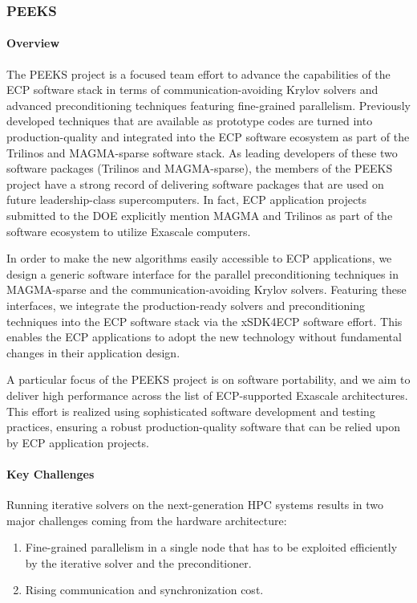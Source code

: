 \subsubsection{PEEKS} 
\paragraph{Overview} 
The PEEKS project is a focused team effort to advance the capabilities of the 
ECP software stack in terms of communication-avoiding Krylov solvers and 
advanced preconditioning techniques featuring fine-grained parallelism.
Previously developed techniques that are available as prototype codes are 
turned into production-quality and integrated into the ECP software ecosystem 
as part of the Trilinos and MAGMA-sparse software stack.
As leading developers of these two software packages (Trilinos and 
MAGMA-sparse), the members of the PEEKS project have a strong record of 
delivering software packages that are used on future leadership-class 
supercomputers. In fact, ECP application projects submitted to the DOE explicitly mention MAGMA and Trilinos as part of the software ecosystem to utilize Exascale computers. 

In order to make the new algorithms easily accessible to ECP applications,
we design a generic software interface for the parallel preconditioning 
techniques in MAGMA-sparse and the communication-avoiding Krylov solvers. 
Featuring these interfaces, we integrate the production-ready solvers and 
preconditioning techniques into the ECP software stack via the xSDK4ECP 
software effort. This enables the ECP applications to adopt the new technology 
without fundamental changes in their application design.

A particular focus of the PEEKS project is on software portability, and we aim to 
deliver high performance across the list of ECP-supported Exascale 
architectures. This effort is realized using sophisticated software development 
and testing practices, ensuring a robust production-quality software that can 
be relied upon by ECP 
application projects.

\paragraph{Key  Challenges}
Running iterative solvers on the next-generation HPC systems results in two 
major challenges coming from the hardware architecture:
\begin{enumerate}
\item 
Fine-grained parallelism in a single node that has to be exploited efficiently 
by the iterative solver and the preconditioner.
\item
Rising communication and synchronization cost.
\end{enumerate}

